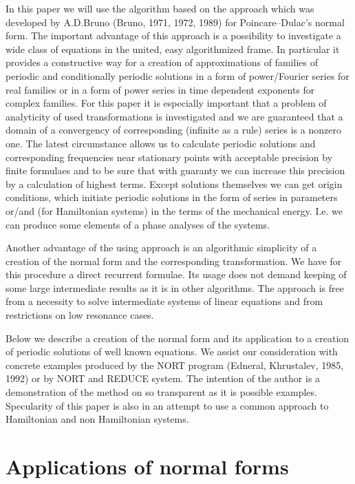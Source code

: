    In this paper we will use the algorithm based on the approach 
which was developed by A.D.Bruno (Bruno, 1971, 1972, 1989) for 
Poincare--Dulac's normal form. The 
important advantage of this approach is a possibility to 
investigate a wide class of equations in the united, easy 
algorithmized frame. In particular it provides a constructive way 
for a creation of approximations of families of 
periodic and conditionally periodic solutions in a form of 
power/Fourier series for real families or in a form of power
series in time dependent exponents for complex families. For this 
paper it is especially important that a problem of analyticity of 
used transformations is investigated and we are guaranteed 
that a domain of a convergency of corresponding (infinite 
as a rule) series is a nonzero one. The latest circumstance allows 
us to calculate 
periodic solutions and corresponding frequencies near stationary 
points with acceptable precision by finite formulaes and to be sure 
that with guaranty we can increase this precision by a calculation 
of highest terms. Except solutions themselves we can get origin 
conditions, which initiate periodic solutions in the form
of series in parameters or/and (for Hamiltonian systems) in the 
terms of the mechanical energy. I.e. we can produce some elements 
of a phase analyses of the systems.

   Another advantage of the using approach is an algorithmic 
simplicity of a creation of the normal form and the corresponding
transformation. We have for this procedure a direct recurrent 
formulae. Its usage does not demand keeping of some large 
intermediate results as it is in other algorithms. The approach is 
free from a necessity to solve intermediate systems of 
linear equations and from restrictions on low resonance cases.

   Below we describe a creation of the normal form and its 
application to a creation of periodic solutions of well known
equations. We assist our consideration with concrete examples 
produced by the NORT program  (Edneral, Khrustalev, 1985, 1992)
or by NORT and REDUCE system. The intention of the author is a
demonstration of the method on so transparent as it is possible
examples. Specularity of this paper is also in an attempt to
use a common approach to Hamiltonian and non Hamiltonian systems.


\section{Applications of normal forms}

